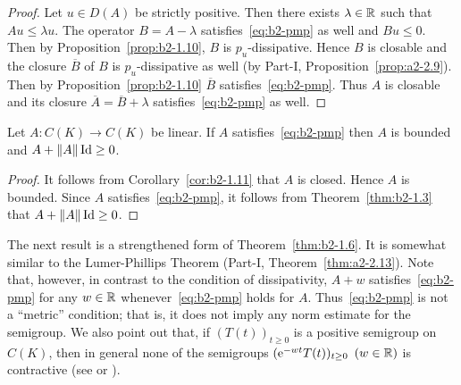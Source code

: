 \begin{proof}%
Let $u \in D(A)$ be strictly positive.
Then there exists $\lambda \in \mathbb{R}$ such that $Au \leq \lambda u$.
The operator $B = A - \lambda$ satisfies~\eqref{eq:b2-pmp} as well and $Bu \leq 0$.
Then by Proposition~\ref{prop:b2-1.10}, $B$ is $p_{u}$-dissipative.
Hence $B$ is closable and the closure $\overline{B}$ of\/ $B$ is $p_{u}$-dissipative as well (by Part-I, Proposition~\ref{prop:a2-2.9}).
Then by Proposition~\ref{prop:b2-1.10} $\overline{B}$ satisfies~\eqref{eq:b2-pmp}.
Thus $A$ is closable and its closure $\overline{A} = \overline{B} + \lambda$ satisfies~\eqref{eq:b2-pmp} as well.
\end{proof}
\begin{corollary}\label{cor:b2-1.12}
Let $A \colon C(K) \to C(K)$ be linear.
If\/ $A$ satisfies~\eqref{eq:b2-pmp} then $A$ is bounded and $A + \|A\|\Id \geq 0$.
\end{corollary}
\begin{proof}
It follows from Corollary~\ref{cor:b2-1.11} that $A$ is closed.
Hence $A$ is bounded.
Since $A$ satisfies~\eqref{eq:b2-pmp}, it follows from Theorem~\ref{thm:b2-1.3} that $A + \|A\|\Id \geq 0$.
\end{proof}
The next result is a strengthened form of Theorem~\ref{thm:b2-1.6}.
It is somewhat similar to the Lumer-Phillips Theorem (Part-I, Theorem~\ref{thm:a2-2.13}).
Note that, however, in contrast to the condition of dissipativity, $A + w$ satisfies~\eqref{eq:b2-pmp} for any $w \in \mathbb{R}$ whenever~\eqref{eq:b2-pmp} holds for $A$.
Thus~\eqref{eq:b2-pmp} is not a \enquote{metric} condition; that is, it does not imply any norm estimate for the semigroup.
We also point out that, if\/ $(T(t))_{t \geq 0}$ is a positive semigroup on $C(K)$, then in general none of the semigroups $(\eu^{-wt}T(t))_{t \geq 0}$ $(w \in \mathbb{R})$ is contractive (see \textcite{battydavies:1983} or \textcite{derndinger:1983}).

